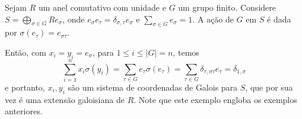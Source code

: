 \begin{exemplo}
Sejam $R$ um anel comutativo com unidade e $G$ um grupo finito. Considere $S = \bigoplus_{\sigma \in G}Re_\sigma$, onde $e_\sigma e_\tau = \delta_{\sigma,\tau} e_\sigma$ e $\sum_{\sigma \in G} e_\sigma = 1$. A ação de $G$ em $S$ é dada por $\sigma(e_\tau) = e_{\sigma\tau}$.

Então, com $x_i = y_i = e_\sigma$, para $1 \leq i \leq |G| = n$, temos
\[\sum_{i=1}^n x_i \sigma(y_i) = \sum_{\tau \in G} e_\tau \sigma(e_\tau) = \sum_{\tau \in G}\delta_{\tau,\sigma\tau} e_\tau = \delta_{1, \sigma}\]
e portanto, $x_i, y_i$ são um sistema de coordenadas de Galois para $S$, que por sua vez é uma extensão galoisiana de $R$. Note que este exemplo engloba os exemplos anteriores.
\end{exemplo}




